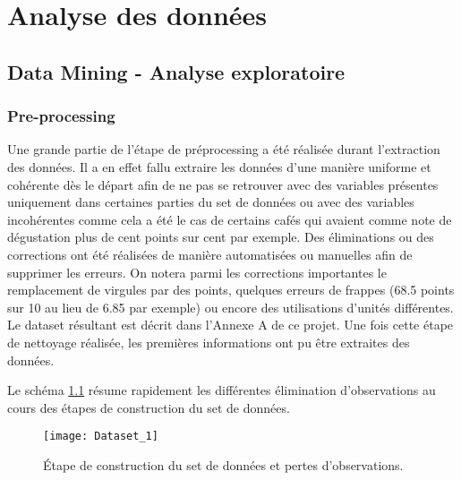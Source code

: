 \chapter{Analyse des données}


\section{Data Mining - Analyse exploratoire}

\subsection{Pre-processing}



Une grande partie de l'étape de préprocessing a été réalisée durant l'extraction des données. Il a en effet fallu extraire les données d'une manière uniforme et cohérente dès le départ afin de ne pas se retrouver avec des variables présentes uniquement dans certaines parties du set de données ou avec des variables incohérentes comme cela a été le cas de certains cafés qui avaient comme note de dégustation plus de cent points sur cent par exemple. Des éliminations ou des corrections ont été réalisées de manière automatisées ou manuelles afin de supprimer les erreurs. On notera parmi les corrections importantes le remplacement de virgules par des points, quelques erreurs de frappes (68.5 points sur 10 au lieu de 6.85 par exemple) ou encore des utilisations d'unités différentes. Le dataset résultant est décrit dans l'Annexe A de ce projet. Une fois cette étape de nettoyage réalisée, les premières informations ont pu être extraites des données.


\noindent Le schéma \ref{DatasetMaking} résume rapidement les différentes élimination d'observations au cours des étapes de construction du set de données. 

\begin{figure}[H]
	\texttt{[image: Dataset\_1]}
	\caption{\label{DatasetMaking} Étape de construction du set de données et pertes d'observations.}
\end{figure}


